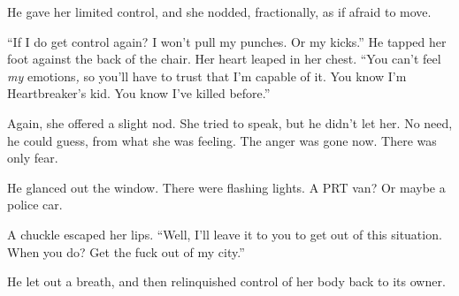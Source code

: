 He gave her limited control, and she nodded, fractionally, as if afraid to move.



``If I do get control again?  I won't pull my punches.  Or my kicks.''  He tapped her foot against the back of the chair.  Her heart leaped in her chest.  ``You can't feel \emph{my }emotions\emph{, }so you'll have to trust that I'm capable of it.  You know I'm Heartbreaker's kid.  You know I've killed before.''



Again, she offered a slight nod.  She tried to speak, but he didn't let her.  No need, he could guess, from what she was feeling.  The anger was gone now.  There was only fear.



He glanced out the window.  There were flashing lights.  A PRT van?  Or maybe a police car.



A chuckle escaped her lips.  ``Well, I'll leave it to you to get out of this situation.  When you do?  Get the fuck out of my city.''



He let out a breath, and then relinquished control of her body back to its owner.





